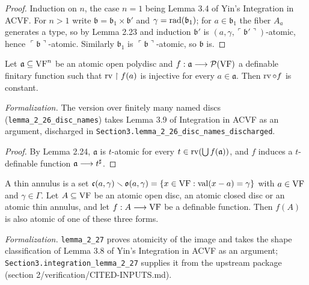 \begin{proof}
\leanok
Induction on $n$, the case $n = 1$ being Lemma 3.4 of Yin's Integration in ACVF. For $n > 1$ write $\mathfrak{b} = \mathfrak{b}_1 \times \mathfrak{b}'$ and $\gamma = \operatorname{rad}(\mathfrak{b}_1)$; for $a \in \mathfrak{b}_1$ the fiber $A_a$ generates a type, so by Lemma 2.23 and induction $\mathfrak{b}'$ is $(a,\gamma,\ulcorner \mathfrak{b}' \urcorner)$-atomic, hence $\ulcorner \mathfrak{b} \urcorner$-atomic. Similarly $\mathfrak{b}_1$ is $\ulcorner \mathfrak{b} \urcorner$-atomic, so $\mathfrak{b}$ is.
\end{proof}

\setcounter{theorem}{25}
\begin{lemma}
\label{at-rv-split}
\leanok
{}
Let $\mathfrak{a} \subseteq \mathrm{VF}^n$ be an atomic open polydisc and $f : \mathfrak{a} \longrightarrow \mathcal{P}(\mathrm{VF})$ a definable finitary function such that $\operatorname{rv} \upharpoonright f(a)$ is injective for every $a \in \mathfrak{a}$. Then $\operatorname{rv} \circ f$ is constant.

\emph{Formalization.} The version over finitely many named discs (\texttt{lemma\_2\_26\_disc\_names}) takes Lemma 3.9 of Integration in ACVF as an argument, discharged in \texttt{Section3.lemma\_2\_26\_disc\_names\_discharged}.
\end{lemma}

\begin{proof}
\leanok
By Lemma 2.24, $\mathfrak{a}$ is $t$-atomic for every $t \in \operatorname{rv}(\bigcup f(\mathfrak{a}))$, and $f$ induces a $t$-definable function $\mathfrak{a} \longrightarrow t^\sharp$.
\end{proof}

\setcounter{theorem}{26}
\begin{lemma}
\label{hae-component-11}
\leanok
{}
A thin annulus is a set $\mathfrak{c}(a,\gamma) \smallsetminus \mathfrak{o}(a,\gamma) = \{x \in \mathrm{VF} : \operatorname{val}(x - a) = \gamma\}$ with $a \in \mathrm{VF}$ and $\gamma \in \Gamma$. Let $A \subseteq \mathrm{VF}$ be an atomic open disc, an atomic closed disc or an atomic thin annulus, and let $f : A \longrightarrow \mathrm{VF}$ be a definable function. Then $f(A)$ is also atomic of one of these three forms.

\emph{Formalization.} \texttt{lemma\_2\_27} proves atomicity of the image and takes the shape classification of Lemma 3.8 of Yin's Integration in ACVF as an argument; \texttt{Section3.integration\_lemma\_2\_27} supplies it from the upstream package (section 2/verification/CITED-INPUTS.md).
\end{lemma}

